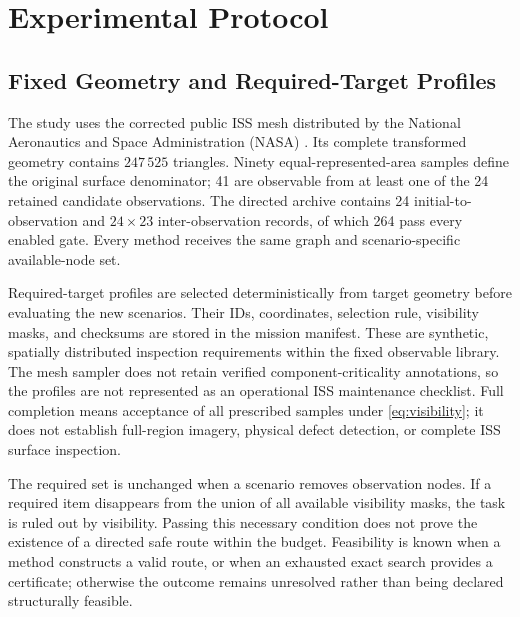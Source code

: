 
\section{Experimental Protocol}
\label{sec:simulation}

\subsection{Fixed Geometry and Required-Target Profiles}

The study uses the corrected public ISS mesh distributed by the National Aeronautics and Space Administration (NASA) \cite{nasa_iss_gltf_model}. Its complete transformed geometry contains $247\,525$ triangles. Ninety equal-represented-area samples define the original surface denominator; 41 are observable from at least one of the 24 retained candidate observations. The directed archive contains 24 initial-to-observation and $24\times23$ inter-observation records, of which 264 pass every enabled gate. Every method receives the same graph and scenario-specific available-node set.

Required-target profiles are selected deterministically from target geometry before evaluating the new scenarios. Their IDs, coordinates, selection rule, visibility masks, and checksums are stored in the mission manifest. These are synthetic, spatially distributed inspection requirements within the fixed observable library. The mesh sampler does not retain verified component-criticality annotations, so the profiles are not represented as an operational ISS maintenance checklist. Full completion means acceptance of all prescribed samples under \eqref{eq:visibility}; it does not establish full-region imagery, physical defect detection, or complete ISS surface inspection.



The required set is unchanged when a scenario removes observation nodes. If a required item disappears from the union of all available visibility masks, the task is ruled out by visibility. Passing this necessary condition does not prove the existence of a directed safe route within the budget. Feasibility is known when a method constructs a valid route, or when an exhausted exact search provides a certificate; otherwise the outcome remains unresolved rather than being declared structurally feasible.

